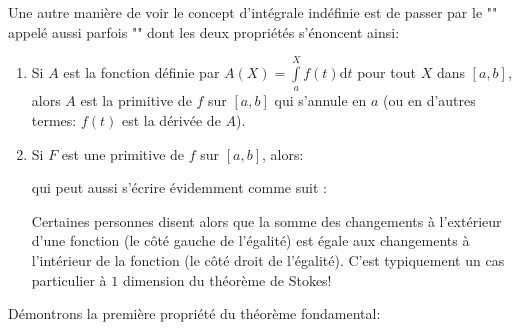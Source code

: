 	Une autre manière de voir le concept d'intégrale indéfinie est de passer par le "" appelé aussi parfois "\label{fundamental theorem of calculus}" dont les deux propriétés s'énoncent ainsi:
	\begin{enumerate}
		\item Si $A$ est la fonction définie par $A(X)=\displaystyle\int\limits_a^X f(t)\mathrm{d}t$ pour tout $X$ dans $[a, b]$, alors $A$ est la primitive de $f$ sur $[a, b]$ qui s'annule en $a$ (ou en d'autres termes: $f (t)$ est la dérivée de $A$).
		
		\item Si $F$ est une primitive de $f$ sur $[a, b]$, alors:
		
		qui peut aussi s'écrire évidemment comme suit :
		
		Certaines personnes disent alors que la somme des changements à l'extérieur d'une fonction (le côté gauche de l'égalité) est égale aux changements à l'intérieur de la fonction (le côté droit de l'égalité). C'est typiquement un cas particulier à $1$ dimension du théorème de Stokes!
	\end{enumerate}
	Démontrons la première propriété du théorème fondamental:
